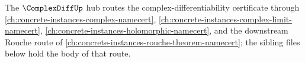 The $\ComplexDiffUp$ hub routes the complex-differentiability certificate through \autoref{ch:concrete-instances-complex-namecert}, \autoref{ch:concrete-instances-complex-limit-namecert}, \autoref{ch:concrete-instances-holomorphic-namecert}, and the downstream Rouche route of \autoref{ch:concrete-instances-rouche-theorem-namecert}; the sibling files below hold the body of that route.



